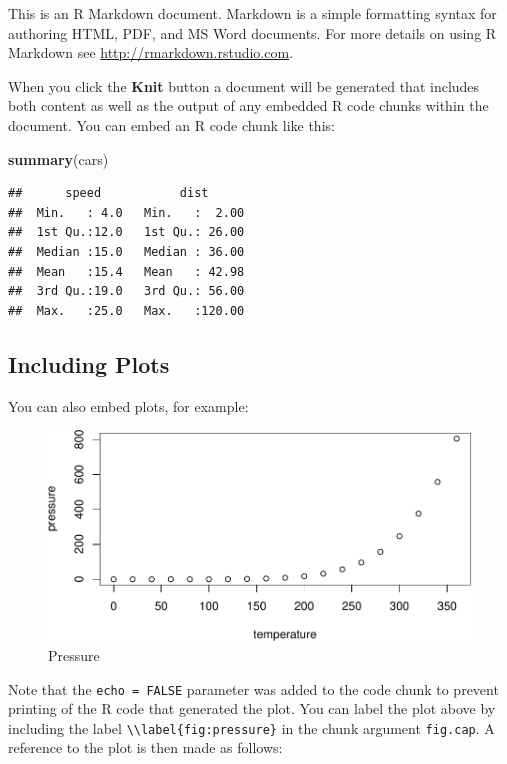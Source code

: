 \documentclass[11pt,]{article}
\newenvironment{Shaded}{\begin{snugshade}}{\end{snugshade}}
\newcommand{\KeywordTok}[1]{\textcolor[rgb]{0.13,0.29,0.53}{\textbf{#1}}}
\newcommand{\NormalTok}[1]{#1}
\begin{document}
This is an R Markdown document. Markdown is a simple formatting syntax
for authoring HTML, PDF, and MS Word documents. For more details on
using R Markdown see \url{http://rmarkdown.rstudio.com}.

When you click the \textbf{Knit} button a document will be generated
that includes both content as well as the output of any embedded R code
chunks within the document. You can embed an R code chunk like this:

\begin{Shaded}
\begin{Highlighting}[]
\KeywordTok{summary}\NormalTok{(cars)}
\end{Highlighting}
\end{Shaded}

\begin{verbatim}
##      speed           dist       
##  Min.   : 4.0   Min.   :  2.00  
##  1st Qu.:12.0   1st Qu.: 26.00  
##  Median :15.0   Median : 36.00  
##  Mean   :15.4   Mean   : 42.98  
##  3rd Qu.:19.0   3rd Qu.: 56.00  
##  Max.   :25.0   Max.   :120.00
\end{verbatim}

\hypertarget{including-plots}{%
\subsection{Including Plots}\label{including-plots}}

You can also embed plots, for example:

\begin{figure}
\centering
\includegraphics{Abschlussarbeit_files/figure-latex/pressure-1.pdf}
\caption{\label{fig:pressure} Pressure}
\end{figure}

Note that the \texttt{echo\ =\ FALSE} parameter was added to the code
chunk to prevent printing of the R code that generated the plot. You can
label the plot above by including the label
\texttt{\textbackslash{}\textbackslash{}label\{fig:pressure\}} in the
chunk argument \texttt{fig.cap}. A reference to the plot is then made as
follows:
\end{document}
